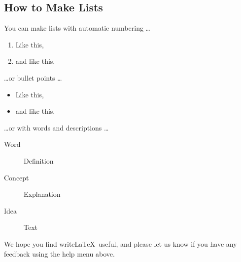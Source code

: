 \documentclass[]{article}
\begin{document}
\subsection{How to Make Lists}

You can make lists with automatic numbering \dots

\begin{enumerate}
\item Like this,
\item and like this.
\end{enumerate}
\dots or bullet points \dots
\begin{itemize}
\item Like this,
\item and like this.
\end{itemize}
\dots or with words and descriptions \dots
\begin{description}
\item[Word] Definition
\item[Concept] Explanation
\item[Idea] Text
\end{description}

We hope you find write\LaTeX\ useful, and please let us know if you have any feedback using the help menu above.

%
\end{document}

